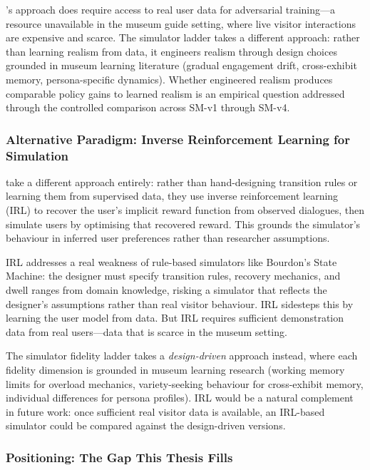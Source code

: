 \documentclass[a4paper, 11pt]{article}
\begin{document}
\citet{yang2023adversarial}'s approach does require access to real user data for adversarial training---a resource unavailable in the museum guide setting, where live visitor interactions are expensive and scarce. The simulator ladder takes a different approach: rather than learning realism from data, it engineers realism through design choices grounded in museum learning literature (gradual engagement drift, cross-exhibit memory, persona-specific dynamics). Whether engineered realism produces comparable policy gains to learned realism is an empirical question addressed through the controlled comparison across SM-v1 through SM-v4.

\subsubsection{Alternative Paradigm: Inverse Reinforcement Learning for Simulation}

\citet{chandramohan2011user} take a different approach entirely: rather than hand-designing transition rules or learning them from supervised data, they use inverse reinforcement learning (IRL) to recover the user's implicit reward function from observed dialogues, then simulate users by optimising that recovered reward. This grounds the simulator's behaviour in inferred user preferences rather than researcher assumptions.

IRL addresses a real weakness of rule-based simulators like Bourdon's State Machine: the designer must specify transition rules, recovery mechanics, and dwell ranges from domain knowledge, risking a simulator that reflects the designer's assumptions rather than real visitor behaviour. IRL sidesteps this by learning the user model from data. But IRL requires sufficient demonstration data from real users---data that is scarce in the museum setting.

The simulator fidelity ladder takes a \emph{design-driven} approach instead, where each fidelity dimension is grounded in museum learning research (working memory limits for overload mechanics, variety-seeking behaviour for cross-exhibit memory, individual differences for persona profiles). IRL would be a natural complement in future work: once sufficient real visitor data is available, an IRL-based simulator could be compared against the design-driven versions.

\subsubsection{Positioning: The Gap This Thesis Fills}
\end{document}
